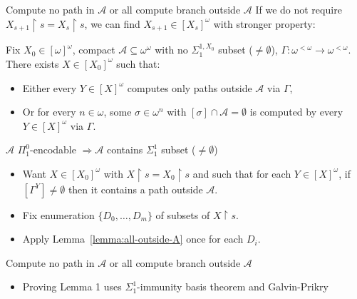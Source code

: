 \begin{frame}{Compute no path in $\mathcal{A}$ or all compute branch
outside $\mathcal{A}$}
  If we do not require $X_{s+1}\restriction s=X_s\restriction s$, we can
  find $X_{s+1}\in[X_s]^\omega$ with stronger property:

  \begin{lemma}
  \label{lemma:all-outside-A}
    Fix $X_0\in[\omega]^\omega$, compact
    $\mathcal{A}\subseteq\omega^\omega$ with no $\Sigma_1^{1,X_0}$ subset
    ($\neq\emptyset$), $\Gamma:\omega^{<\omega} \rightarrow
    \omega^{<\omega}$. There exists $X\in[X_0]^\omega$ such that:

    \begin{itemize}
      \item Either every $Y\in[X]^\omega$ computes only paths outside
        $\mathcal{A}$ via $\Gamma$,
      \item Or for every $n\in\omega$, some $\sigma\in\omega^n$ with
        $[\sigma]\cap\mathcal{A}=\emptyset$ is computed by every
        $Y\in[X]^\omega$ via $\Gamma$.
    \end{itemize}
  \end{lemma}
\end{frame}

\begin{frame}{$\mathcal{A}$ $\Pi_1^0$-encodable $\Rightarrow \mathcal{A}$
contains $\Sigma_1^1$ subset ($\neq\emptyset$)}
  \begin{itemize}
    \item Want $X\in[X_0]^\omega$ with $X\restriction s=X_0\restriction s$
      and such that for each $Y\in[X]^\omega$, if $[\Gamma^Y]\neq\emptyset$
      then it contains a path outside $\mathcal{A}$.
    \item Fix enumeration $\{D_0,\ldots,D_m\}$ of subsets of $X\restriction
      s$.
    \item Apply Lemma~\ref{lemma:all-outside-A} once for each $D_i$.
  \end{itemize}
\end{frame}

\begin{frame}{Compute no path in $\mathcal{A}$ or all compute branch
  outside $\mathcal{A}$}
  \begin{itemize}
    \item Proving Lemma 1 uses $\Sigma_1^1$-immunity basis theorem and
      Galvin-Prikry
  \end{itemize}
\end{frame}

